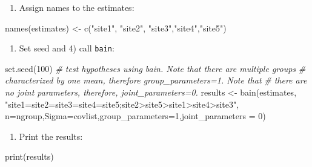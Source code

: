 \documentclass[
]{book}
\newenvironment{Shaded}{\begin{snugshade}}{\end{snugshade}}
\newcommand{\AttributeTok}[1]{\textcolor[rgb]{0.77,0.63,0.00}{#1}}
\newcommand{\CommentTok}[1]{\textcolor[rgb]{0.56,0.35,0.01}{\textit{#1}}}
\newcommand{\DecValTok}[1]{\textcolor[rgb]{0.00,0.00,0.81}{#1}}
\newcommand{\FunctionTok}[1]{\textcolor[rgb]{0.00,0.00,0.00}{#1}}
\newcommand{\NormalTok}[1]{#1}
\newcommand{\OtherTok}[1]{\textcolor[rgb]{0.56,0.35,0.01}{#1}}
\newcommand{\StringTok}[1]{\textcolor[rgb]{0.31,0.60,0.02}{#1}}
\providecommand{\tightlist}{%
  \setlength{\itemsep}{0pt}\setlength{\parskip}{0pt}}
\begin{document}
\begin{enumerate}
\def\labelenumi{\arabic{enumi})}
\setcounter{enumi}{1}
\tightlist
\item
  Assign names to the estimates:
\end{enumerate}

\begin{Shaded}
\begin{Highlighting}[]
\FunctionTok{names}\NormalTok{(estimates) }\OtherTok{\textless{}{-}} \FunctionTok{c}\NormalTok{(}\StringTok{"site1"}\NormalTok{, }\StringTok{"site2"}\NormalTok{, }\StringTok{"site3"}\NormalTok{,}\StringTok{"site4"}\NormalTok{,}\StringTok{"site5"}\NormalTok{)}
\end{Highlighting}
\end{Shaded}

\begin{enumerate}
\def\labelenumi{\arabic{enumi})}
\setcounter{enumi}{2}
\tightlist
\item
  Set seed and 4) call \texttt{bain}:
\end{enumerate}

\begin{Shaded}
\begin{Highlighting}[]
\FunctionTok{set.seed}\NormalTok{(}\DecValTok{100}\NormalTok{)}
\CommentTok{\# test hypotheses using bain. Note that there are multiple groups}
\CommentTok{\# characterized by one mean, therefore group\_parameters=1. Note that}
\CommentTok{\# there are no joint parameters, therefore, joint\_parameters=0.}
\NormalTok{results }\OtherTok{\textless{}{-}} \FunctionTok{bain}\NormalTok{(estimates,}
                \StringTok{"site1=site2=site3=site4=site5;site2\textgreater{}site5\textgreater{}site1\textgreater{}site4\textgreater{}site3"}\NormalTok{,}
                \AttributeTok{n=}\NormalTok{ngroup,}\AttributeTok{Sigma=}\NormalTok{covlist,}\AttributeTok{group\_parameters=}\DecValTok{1}\NormalTok{,}\AttributeTok{joint\_parameters =} \DecValTok{0}\NormalTok{)}
\end{Highlighting}
\end{Shaded}

\begin{enumerate}
\def\labelenumi{\arabic{enumi})}
\setcounter{enumi}{4}
\tightlist
\item
  Print the results:
\end{enumerate}

\begin{Shaded}
\begin{Highlighting}[]
\FunctionTok{print}\NormalTok{(results)}
\end{Highlighting}
\end{Shaded}
\end{document}
